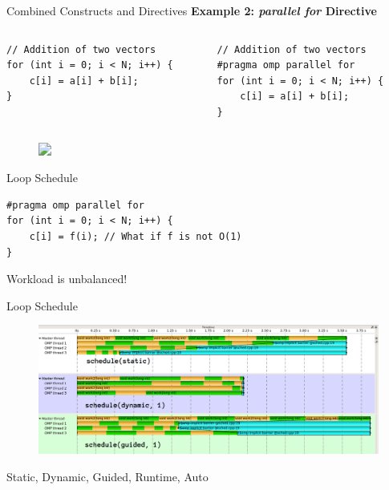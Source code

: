 \begin{frame}[fragile]{Combined Constructs and Directives}
  \textbf{Example 2: \textit{parallel for} Directive}
  \begin{columns}[T] %
    \begin{column}{0.5\textwidth}
      \vspace{-10pt} %
      \begin{verbatim}
// Addition of two vectors
for (int i = 0; i < N; i++) {
    c[i] = a[i] + b[i];
}
      \end{verbatim}
    \end{column}

    \begin{column}{0.5\textwidth}
      \vspace{-10pt} %
      \begin{verbatim}
// Addition of two vectors
#pragma omp parallel for
for (int i = 0; i < N; i++) {
    c[i] = a[i] + b[i];
}
      \end{verbatim}
    \end{column}
  \end{columns}
  \begin{figure}
    \centering
    \includegraphics<1-2>[width=0.55\linewidth]{day8_am/img/parallel-for-1.png}
  \end{figure}
  \centering {}

\end{frame}

\begin{frame}[fragile]{Loop Schedule}


  \begin{verbatim}
#pragma omp parallel for
for (int i = 0; i < N; i++) {
    c[i] = f(i); // What if f is not O(1)
}
\end{verbatim}

  Workload is unbalanced!

\end{frame}

\begin{frame}[fragile]{Loop Schedule}
  \begin{figure}
    \centering
    \includegraphics[width=0.8\linewidth]{day8_am/img/schedule-trace.png}
  \end{figure}

  \centering
  Static, Dynamic, Guided, Runtime, Auto

\end{frame}

